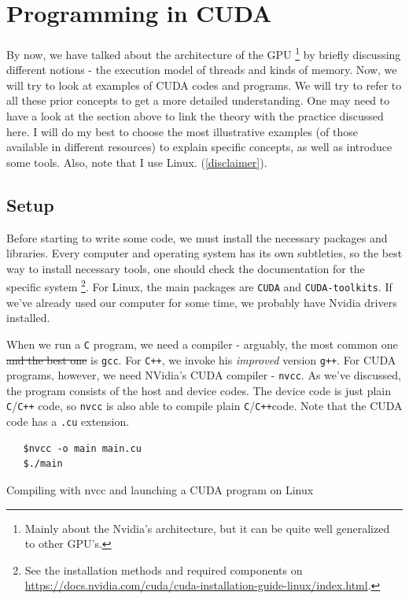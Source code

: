 \section{Programming in CUDA}

\paragraph{} By now, we have talked about the architecture of the GPU \footnote{Mainly about the Nvidia's architecture, but it 
can be quite well generalized to other GPU's.} by briefly discussing different notions - 
the execution model of threads and kinds of memory. Now, we will try to look at examples of CUDA codes and programs. 
We will try to refer to 
all these prior concepts to get a more detailed understanding. One may need to have a look at the section above 
to link the theory with the practice discussed here. I will do my best to choose the most illustrative examples (of those available 
in different resources) to explain specific concepts, 
as well as introduce some tools. 
Also, note that I use Linux. (\autoref{disclaimer}).

\subsection{Setup}
Before starting to write some code, we must install the necessary packages and libraries. Every computer and operating system 
has its own subtleties, so the best way to install necessary tools, one should check the documentation for the specific system
\footnote{See the installation methods and required components on \url{https://docs.nvidia.com/cuda/cuda-installation-guide-linux/index.html}.}.
For Linux, the main packages are \verb|CUDA| and \verb|CUDA-toolkits|. If we've already used our computer for some time,
we probably have Nvidia drivers installed. 



When we run a \verb|C| program, we need a compiler - arguably, the most common one \sout{and the best one} is \verb|gcc|. For \verb|C++|, 
we invoke his \textit{improved} version \verb|g++|. For CUDA programs, however, we need NVidia's CUDA compiler -
\verb|nvcc|. As we've discussed, the program 
consists of the host and device codes. The device code is just plain \verb|C|/\verb|C++| code, so \verb|nvcc| is also able 
to compile plain \verb|C|/\verb|C++|code. Note that the CUDA code has a \verb|.cu| extension.

\begin{listing}[!ht]
\begin{verbatim}
   $nvcc -o main main.cu
   $./main
\end{verbatim}
\vspace{-0.7cm}
\caption{Compiling with nvcc and launching a CUDA program on Linux}
\label{nvcc_cuda}
\end{listing}

